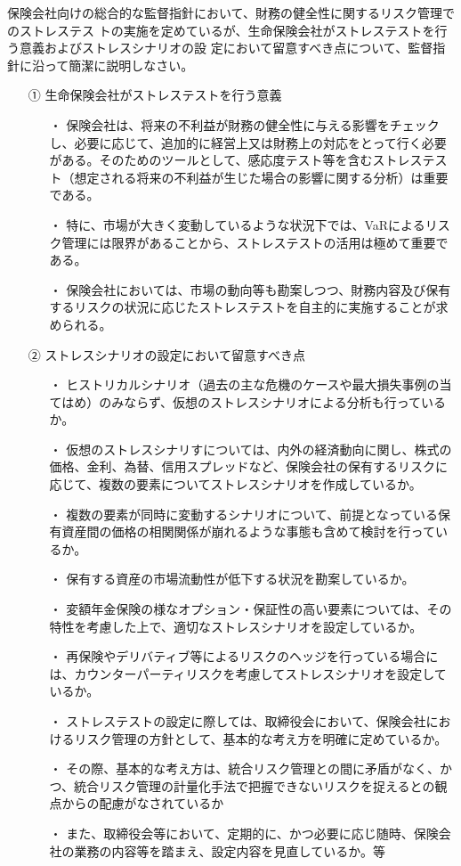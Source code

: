 \documentclass[report,gutter=10mm,fore-edge=10mm,uplatex,dvipdfmx]{jlreq}
\begin{document}

保険会社向けの総合的な監督指針において、財務の健全性に関するリスク管理でのストレステス
トの実施を定めているが、生命保険会社がストレステストを行う意義およびストレスシナリオの設
定において留意すべき点について、監督指針に沿って簡潔に説明しなさい。
\answer{}
\begin{itemize}
\item[①] 生命保険会社がストレステストを行う意義
\begin{itemize}
\item[・] 保険会社は、将来の不利益が財務の健全性に与える影響をチェックし、必要に応じて、追加的に経営上又は財務上の対応をとって行く必要がある。そのためのツールとして、感応度テスト等を含むストレステスト（想定される将来の不利益が生じた場合の影響に関する分析）は重要である。
\item[・] 特に、市場が大きく変動しているような状況下では、VaRによるリスク管理には限界があることから、ストレステストの活用は極めて重要である。
\item[・] 保険会社においては、市場の動向等も勘案しつつ、財務内容及び保有するリスクの状況に応じたストレステストを自主的に実施することが求められる。
\end{itemize}
\item[②] ストレスシナリオの設定において留意すべき点
\begin{itemize}
\item[・] ヒストリカルシナリオ（過去の主な危機のケースや最大損失事例の当てはめ）のみならず、仮想のストレスシナリオによる分析も行っているか。
\item[・] 仮想のストレスシナリすについては、内外の経済動向に関し、株式の価格、金利、為替、信用スプレッドなど、保険会社の保有するリスクに応じて、複数の要素についてストレスシナリオを作成しているか。
\item[・] 複数の要素が同時に変動するシナリオについて、前提となっている保有資産間の価格の相関関係が崩れるような事態も含めて検討を行っているか。
\item[・] 保有する資産の市場流動性が低下する状況を勘案しているか。
\item[・] 変額年金保険の様なオプション・保証性の高い要素については、その特性を考慮した上で、適切なストレスシナリオを設定しているか。
\item[・] 再保険やデリバティブ等によるリスクのヘッジを行っている場合には、カウンターパーティリスクを考慮してストレスシナリオを設定しているか。
\item[・] ストレステストの設定に際しては、取締役会において、保険会社におけるリスク管理の方針として、基本的な考え方を明確に定めているか。
\item[・] その際、基本的な考え方は、統合リスク管理との間に矛盾がなく、かつ、統合リスク管理の計量化手法で把握できないリスクを捉えるとの観点からの配慮がなされているか
\item[・] また、取締役会等において、定期的に、かつ必要に応じ随時、保険会社の業務の内容等を踏まえ、設定内容を見直しているか。等
\end{itemize}
\end{itemize}
\end{document}
